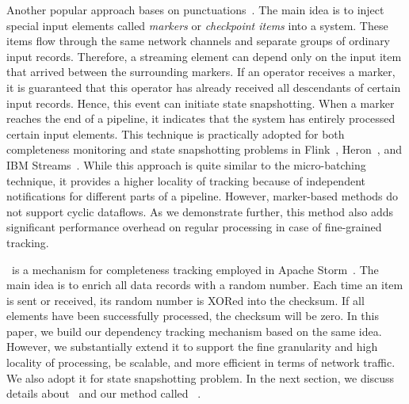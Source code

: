 Another popular approach bases on punctuations~\cite{Tucker:2003:EPS:776752.776780}. The main idea is to inject special input elements called {\em markers} or {\em checkpoint items} into a system. These items flow through the same network channels and separate groups of ordinary input records. Therefore, a streaming element can depend only on the input item that arrived between the surrounding markers. If an operator receives a marker, it is guaranteed that this operator has already received all descendants of certain input records. Hence, this event can initiate state snapshotting. When a marker reaches the end of a pipeline, it indicates that the system has entirely processed certain input elements. This technique is practically adopted for both completeness monitoring and state snapshotting problems in Flink~\cite{Carbone:2017:SMA:3137765.3137777}, Heron~\cite{Kulkarni:2015:THS:2723372.2742788}, and IBM Streams~\cite{jacques2016consistent}. While this approach is quite similar to the micro-batching technique, it provides a higher locality of tracking because of independent notifications for different parts of a pipeline. However, marker-based methods do not support cyclic dataflows. As we demonstrate further, this method also adds significant performance overhead on regular processing in case of fine-grained tracking.

\acker\ is a mechanism for completeness tracking employed in Apache Storm~\cite{apache:storm}. The main idea is to enrich all data records with a random number. Each time an item is sent or received, its random number is XORed into the checksum. If all elements have been successfully processed, the checksum will be zero. In this paper, we build our dependency tracking mechanism based on the same idea. However, we substantially extend it to support the fine granularity and high locality of processing, be scalable, and more efficient in terms of network traffic. We also adopt it for state snapshotting problem. In the next section, we discuss details about \acker\ and our method called \tracker\ .